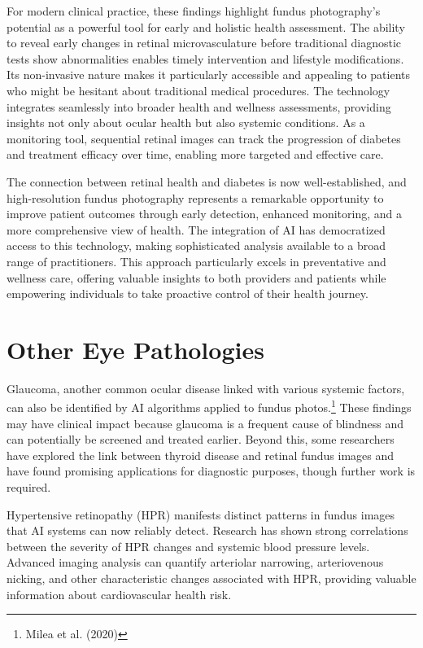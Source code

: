 \documentclass[
  Letterpaper,
]{scrbook}
\begin{document}
For modern clinical practice, these findings highlight fundus
photography's potential as a powerful tool for early and holistic health
assessment. The ability to reveal early changes in retinal
microvasculature before traditional diagnostic tests show abnormalities
enables timely intervention and lifestyle modifications. Its
non-invasive nature makes it particularly accessible and appealing to
patients who might be hesitant about traditional medical procedures. The
technology integrates seamlessly into broader health and wellness
assessments, providing insights not only about ocular health but also
systemic conditions. As a monitoring tool, sequential retinal images can
track the progression of diabetes and treatment efficacy over time,
enabling more targeted and effective care.

The connection between retinal health and diabetes is now
well-established, and high-resolution fundus photography represents a
remarkable opportunity to improve patient outcomes through early
detection, enhanced monitoring, and a more comprehensive view of health.
The integration of AI has democratized access to this technology, making
sophisticated analysis available to a broad range of practitioners. This
approach particularly excels in preventative and wellness care, offering
valuable insights to both providers and patients while empowering
individuals to take proactive control of their health journey.

\section{Other Eye Pathologies}\label{other-eye-pathologies}

Glaucoma, another common ocular disease linked with various systemic
factors, can also be identified by AI algorithms applied to fundus
photos.\footnote{Milea et al. (2020)} These findings may have clinical
impact because glaucoma is a frequent cause of blindness and can
potentially be screened and treated earlier. Beyond this, some
researchers have explored the link between thyroid disease and retinal
fundus images and have found promising applications for diagnostic
purposes, though further work is required.

Hypertensive retinopathy (HPR) manifests distinct patterns in fundus
images that AI systems can now reliably detect. Research has shown
strong correlations between the severity of HPR changes and systemic
blood pressure levels. Advanced imaging analysis can quantify arteriolar
narrowing, arteriovenous nicking, and other characteristic changes
associated with HPR, providing valuable information about cardiovascular
health risk.
\end{document}
